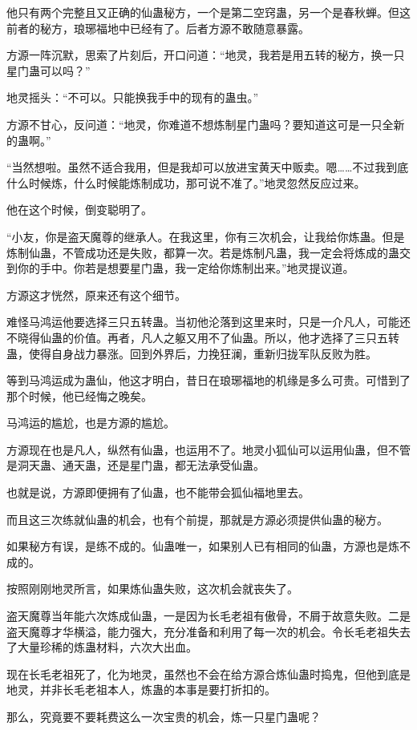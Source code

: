 \begin{this_body}
他只有两个完整且又正确的仙蛊秘方，一个是第二空窍蛊，另一个是春秋蝉。但这前者的秘方，琅琊福地中已经有了。后者方源不敢随意暴露。

方源一阵沉默，思索了片刻后，开口问道：“地灵，我若是用五转的秘方，换一只星门蛊可以吗？”

地灵摇头：“不可以。只能换我手中的现有的蛊虫。”

方源不甘心，反问道：“地灵，你难道不想炼制星门蛊吗？要知道这可是一只全新的蛊啊。”

“当然想啦。虽然不适合我用，但是我却可以放进宝黄天中贩卖。嗯……不过我到底什么时候炼，什么时候能炼制成功，那可说不准了。”地灵忽然反应过来。

他在这个时候，倒变聪明了。

“小友，你是盗天魔尊的继承人。在我这里，你有三次机会，让我给你炼蛊。但是炼制仙蛊，不管成功还是失败，都算一次。若是炼制凡蛊，我一定会将炼成的蛊交到你的手中。你若是想要星门蛊，我一定给你炼制出来。”地灵提议道。

方源这才恍然，原来还有这个细节。

难怪马鸿运他要选择三只五转蛊。当初他沦落到这里来时，只是一介凡人，可能还不晓得仙蛊的价值。再者，凡人之躯又用不了仙蛊。所以，他才选择了三只五转蛊，使得自身战力暴涨。回到外界后，力挽狂澜，重新归拢军队反败为胜。

等到马鸿运成为蛊仙，他这才明白，昔日在琅琊福地的机缘是多么可贵。可惜到了那个时候，他已经悔之晚矣。

马鸿运的尴尬，也是方源的尴尬。

方源现在也是凡人，纵然有仙蛊，也运用不了。地灵小狐仙可以运用仙蛊，但不管是洞天蛊、通天蛊，还是星门蛊，都无法承受仙蛊。

也就是说，方源即便拥有了仙蛊，也不能带会狐仙福地里去。

而且这三次练就仙蛊的机会，也有个前提，那就是方源必须提供仙蛊的秘方。

如果秘方有误，是练不成的。仙蛊唯一，如果别人已有相同的仙蛊，方源也是炼不成的。

按照刚刚地灵所言，如果炼仙蛊失败，这次机会就丧失了。

盗天魔尊当年能六次炼成仙蛊，一是因为长毛老祖有傲骨，不屑于故意失败。二是盗天魔尊才华横溢，能力强大，充分准备和利用了每一次的机会。令长毛老祖失去了大量珍稀的炼蛊材料，六次大出血。

现在长毛老祖死了，化为地灵，虽然也不会在给方源合炼仙蛊时捣鬼，但他到底是地灵，并非长毛老祖本人，炼蛊的本事是要打折扣的。

那么，究竟要不要耗费这么一次宝贵的机会，炼一只星门蛊呢？


\end{this_body}
